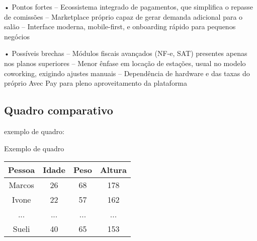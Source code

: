• Pontos fortes
– Ecossistema integrado de pagamentos, que simplifica o repasse de comissões
– Marketplace próprio capaz de gerar demanda adicional para o salão
– Interface moderna, mobile-first, e onboarding rápido para pequenos negócios

• Possíveis brechas
– Módulos fiscais avançados (NF-e, SAT) presentes apenas nos planos superiores
– Menor ênfase em locação de estações, usual no modelo coworking, exigindo ajustes manuais
– Dependência de hardware e das taxas do próprio Avec Pay para pleno aproveitamento da plataforma

\subsection{Quadro comparativo}
exemplo de quadro:
\begin{quadro}[htb]
	\caption{\label{quadro_exemplo}Exemplo de quadro}
	\begin{tabular}{|c|c|c|c|}
		\hline
		\textbf{Pessoa} & \textbf{Idade} & \textbf{Peso} & \textbf{Altura} \\ \hline
		Marcos & 26    & 68   & 178    \\ \hline
		Ivone  & 22    & 57   & 162    \\ \hline
		...    & ...   & ...  & ...    \\ \hline
		Sueli  & 40    & 65   & 153    \\ \hline
	\end{tabular}
\end{quadro}